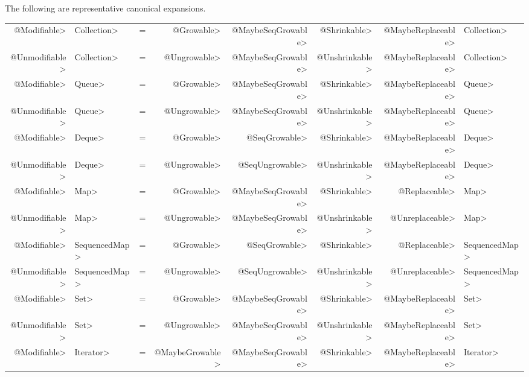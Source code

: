 
The following are representative canonical expansions.

\noindent
\begin{smaller}
\setlength{\tabcolsep}{.33\tabcolsep}
\begin{tabular}{rlcrrrrl}
\<@Modifiable> & \<Collection> & = & \<@Growable> & \<@MaybeSeqGrowable> & \<@Shrinkable> & \<@MaybeReplaceable> & \<Collection> \\
\<@Unmodifiable> & \<Collection> & = & \<@Ungrowable> & \<@MaybeSeqGrowable> & \<@Unshrinkable> & \<@MaybeReplaceable> & \<Collection> \\
\<@Modifiable> & \<Queue>    & = & \<@Growable> & \<@MaybeSeqGrowable> & \<@Shrinkable> & \<@MaybeReplaceable> & \<Queue> \\
\<@Unmodifiable> & \<Queue>    & = & \<@Ungrowable> & \<@MaybeSeqGrowable> & \<@Unshrinkable> & \<@MaybeReplaceable> & \<Queue> \\
\<@Modifiable> & \<Deque>    & = & \<@Growable> & \<@SeqGrowable> & \<@Shrinkable> & \<@MaybeReplaceable> & \<Deque> \\
\<@Unmodifiable> & \<Deque>    & = & \<@Ungrowable> & \<@SeqUngrowable> & \<@Unshrinkable> & \<@MaybeReplaceable> & \<Deque> \\
\<@Modifiable> & \<Map>      & = & \<@Growable> & \<@MaybeSeqGrowable> & \<@Shrinkable> & \<@Replaceable> & \<Map> \\
\<@Unmodifiable> & \<Map>      & = & \<@Ungrowable> & \<@MaybeSeqGrowable> & \<@Unshrinkable> & \<@Unreplaceable> & \<Map> \\
\<@Modifiable> & \<SequencedMap> & = & \<@Growable> & \<@SeqGrowable> & \<@Shrinkable> & \<@Replaceable> & \<SequencedMap> \\
\<@Unmodifiable> & \<SequencedMap> & = & \<@Ungrowable> & \<@SeqUngrowable> & \<@Unshrinkable> & \<@Unreplaceable> & \<SequencedMap> \\
\<@Modifiable> & \<Set>      & = & \<@Growable> & \<@MaybeSeqGrowable> & \<@Shrinkable> & \<@MaybeReplaceable> & \<Set> \\
\<@Unmodifiable> & \<Set>      & = & \<@Ungrowable> & \<@MaybeSeqGrowable> & \<@Unshrinkable> & \<@MaybeReplaceable> & \<Set> \\
\<@Modifiable> & \<Iterator> & = & \<@MaybeGrowable> & \<@MaybeSeqGrowable> & \<@Shrinkable> & \<@MaybeReplaceable> & \<Iterator> \\

\end{tabular}
\end{smaller}
